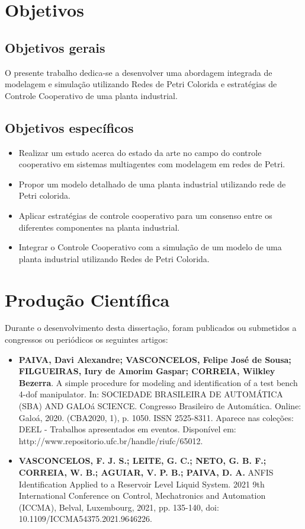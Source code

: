 \section{Objetivos}
\subsection{Objetivos gerais}
 O presente trabalho dedica-se a desenvolver uma abordagem integrada de modelagem e simulação utilizando Redes de Petri Colorida e estratégias de Controle Cooperativo de uma planta industrial.

\subsection{Objetivos específicos}
\begin{itemize}[]
    \item {Realizar um estudo acerca do estado da arte no campo do controle cooperativo em sistemas multiagentes com modelagem em redes de Petri.}
    
    \item {Propor um modelo detalhado de uma planta industrial utilizando rede de Petri colorida.}
    
    \item {Aplicar estratégias de controle cooperativo para um consenso entre os diferentes componentes na planta industrial.}

    \item {Integrar  o  Controle Cooperativo com a  simulação de um modelo de uma planta industrial utilizando Redes de Petri Colorida.} 
\end{itemize}


\section{Produção Científica}
Durante o desenvolvimento desta dissertação, foram publicados ou submetidos a congressos ou periódicos os seguintes artigos:

\begin{itemize}
    \item \textbf{PAIVA, Davi Alexandre; VASCONCELOS, Felipe José de Sousa; FILGUEIRAS, Iury de Amorim Gaspar; CORREIA, Wilkley Bezerra}. A simple procedure for modeling and identification of a test bench 4-dof manipulator. In: SOCIEDADE BRASILEIRA DE AUTOMÁTICA (SBA) AND GALOá SCIENCE.
    Congresso Brasileiro de Automática. Online: Galoá, 2020. (CBA2020, 1), p. 1050. ISSN
    2525-8311. Aparece nas coleções: DEEL - Trabalhos apresentados em eventos. Disponível em:
    http://www.repositorio.ufc.br/handle/riufc/65012.

    \item \textbf{VASCONCELOS, F. J. S.; LEITE, G. C.; NETO, G. B. F.; CORREIA, W. B.; AGUIAR, V. P. B.; PAIVA, D. A.} ANFIS Identification Applied to a Reservoir Level Liquid System. 2021 9th International Conference on Control, Mechatronics and Automation (ICCMA), Belval, Luxembourg, 2021, pp. 135-140, doi: 10.1109/ICCMA54375.2021.9646226.
\end{itemize}



